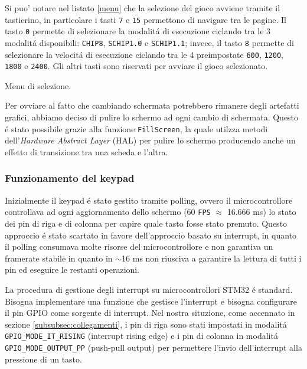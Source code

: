 \documentclass[a4paper]{article}
\begin{document}
Si puo' notare nel listato \ref{menu} che la selezione del gioco avviene tramite il tastierino, in particolare i tasti \texttt{7} e \texttt{15} permettono di navigare tra le pagine. Il tasto \texttt{0} permette di selezionare la modalitá di esecuzione ciclando tra le 3 modalitá disponibili: \texttt{CHIP8}, \texttt{SCHIP1.0} e \texttt{SCHIP1.1}; invece, il tasto \texttt{8} permette di selezionare la velocitá di esecuzione ciclando tra le 4 preimpostate \texttt{600}, \texttt{1200}, \texttt{1800} e \texttt{2400}. Gli altri tasti sono riservati per avviare il gioco selezionato.

\begin{Listing}[h!t] %
    \centering
    \caption{Menu di selezione.}
    \label{menu}
\end{Listing}

Per ovviare al fatto che cambiando schermata potrebbero rimanere degli artefatti grafici, abbiamo deciso di pulire lo schermo ad ogni cambio di schermata. Questo é stato possibile grazie alla funzione \texttt{FillScreen}, la quale utilzza metodi dell'\textit{Hardware Abstract Layer} (HAL) per pulire lo schermo producendo anche un effetto di transizione tra una scheda e l'altra.

\subsubsection{Funzionamento del keypad}\label{subsubsec:keypad}

Inizialmente il keypad é stato gestito tramite polling, ovvero il microcontrollore controllava ad ogni aggiornamento dello schermo (60 \texttt{FPS} $\approx$ 16.666 ms) lo stato dei pin di riga e di colonna per capire quale tasto fosse stato premuto. Questo approccio é stato scartato in favore dell'approccio basato su interrupt, in quanto il polling consumava molte risorse del microcontrollore e non garantiva un framerate stabile in quanto in $\sim$16 ms non riusciva a garantire la lettura di tutti i pin ed eseguire le restanti operazioni.

La procedura di gestione degli interrupt su microcontrollori STM32 é standard. Bisogna implementare una funzione che gestisce l'interrupt e bisogna configurare il pin GPIO come sorgente di interrupt. Nel nostra situzione, come accennato in sezione \ref{subsubsec:collegamenti}, i pin di riga sono stati impostati in modalitá \texttt{GPIO\_MODE\_IT\_RISING} (interrupt rising edge) e i pin di colonna in modalitá \texttt{GPIO\_MODE\_OUTPUT\_PP} (push-pull output) per permettere l'invio dell'interrupt alla pressione di un tasto.
\end{document}
